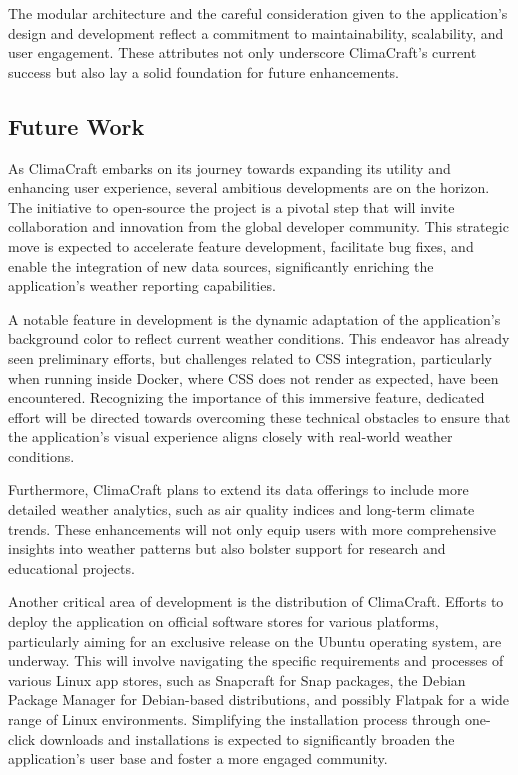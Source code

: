 \documentclass[sn-mathphys-num]{sn-jnl}%
\begin{document}
The modular architecture and the careful consideration given to the application's design and development reflect a commitment to maintainability, scalability, and user engagement. These attributes not only underscore ClimaCraft's current success but also lay a solid foundation for future enhancements.

\subsection{Future Work}\label{sec5.2}
As ClimaCraft embarks on its journey towards expanding its utility and enhancing user experience, several ambitious developments are on the horizon. The initiative to open-source the project is a pivotal step that will invite collaboration and innovation from the global developer community. This strategic move is expected to accelerate feature development, facilitate bug fixes, and enable the integration of new data sources, significantly enriching the application's weather reporting capabilities.

A notable feature in development is the dynamic adaptation of the application's background color to reflect current weather conditions. This endeavor has already seen preliminary efforts, but challenges related to CSS integration, particularly when running inside Docker, where CSS does not render as expected, have been encountered. Recognizing the importance of this immersive feature, dedicated effort will be directed towards overcoming these technical obstacles to ensure that the application's visual experience aligns closely with real-world weather conditions.

Furthermore, ClimaCraft plans to extend its data offerings to include more detailed weather analytics, such as air quality indices and long-term climate trends. These enhancements will not only equip users with more comprehensive insights into weather patterns but also bolster support for research and educational projects.

Another critical area of development is the distribution of ClimaCraft. Efforts to deploy the application on official software stores for various platforms, particularly aiming for an exclusive release on the Ubuntu operating system, are underway. This will involve navigating the specific requirements and processes of various Linux app stores, such as Snapcraft for Snap packages, the Debian Package Manager for Debian-based distributions, and possibly Flatpak for a wide range of Linux environments. Simplifying the installation process through one-click downloads and installations is expected to significantly broaden the application's user base and foster a more engaged community.
\end{document}
